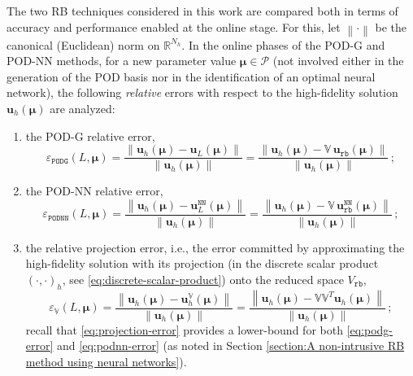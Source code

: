 \documentclass{elsarticle}
\numberwithin{equation}{section}
\theoremstyle{theorem}
\theoremstyle{definition}
\theoremstyle{remark}
\theoremstyle{proposition}
\numberwithin{figure}{section}
\newcommand{\norm}[1]{\left\lVert#1\right\rVert}
\newcommand{\bg}[1]{\boldsymbol{#1}}
\begin{document}
		The two RB techniques considered in this work are compared both in terms of accuracy and performance enabled at the online stage. For this, let $\norm{\cdot}$ be the canonical (Euclidean) norm on $\mathbb{R}^{N_h}$. In the online phases of the POD-G and POD-NN methods, for a new parameter value $\bg{\mu} \in \mathcal{P}$ (not involved either in the generation of the POD basis nor in the identification of an optimal neural network), the following \emph{relative} errors with respect to the high-fidelity solution $\mathbf{u}_h(\bg{\mu})$ are analyzed:
		\begin{enumerate}[label=(\alph*)]
			\item the POD-G relative error,
			\begin{equation}
				\label{eq:podg-error}
				\varepsilon_{\texttt{PODG}}^{}(L, \bg{\mu}) = \dfrac{\norm{\mathbf{u}_h(\bg{\mu}) - \mathbf{u}_L(\bg{\mu})}}{\norm{\mathbf{u}_h(\bg{\mu})}} = \dfrac{\norm{\mathbf{u}_h(\bg{\mu}) - \mathbb{V} \, \mathbf{u}_{\texttt{rb}}(\bg{\mu})}}{\norm{\mathbf{u}_h(\bg{\mu})}} \, ;
			\end{equation} 
			\item the POD-NN relative error,
			\begin{equation}
				\label{eq:podnn-error}
				\varepsilon_{\texttt{PODNN}}^{}(L, \bg{\mu}) = \dfrac{\norm{\mathbf{u}_h(\bg{\mu}) - \mathbf{u}_L^{\texttt{NN}}(\bg{\mu})}}{\norm{\mathbf{u}_h(\bg{\mu})}} = \dfrac{\norm{\mathbf{u}_h(\bg{\mu}) - \mathbb{V} \, \mathbf{u}_{\texttt{rb}}^{\texttt{NN}}(\bg{\mu})}}{\norm{\mathbf{u}_h(\bg{\mu})}} \, ;
			\end{equation} 
			\item the relative projection error, i.e., the error committed by approximating the high-fidelity solution with its projection (in the discrete scalar product $(\cdot,\cdot)_h$, see \eqref{eq:discrete-scalar-product}) onto the reduced space $V_{\texttt{rb}}$,
			\begin{equation}
				\label{eq:projection-error}
				\varepsilon_{\mathbb{V}}^{}(L, \bg{\mu}) = \dfrac{\norm{\mathbf{u}_h(\bg{\mu}) - \mathbf{u}_h^{\mathbb{V}}(\bg{\mu})}}{\norm{\mathbf{u}_h(\bg{\mu})}} = \dfrac{\norm{\mathbf{u}_h(\bg{\mu}) - \mathbb{V} \mathbb{V}^T \mathbf{u}_h(\bg{\mu})}}{\norm{\mathbf{u}_h(\bg{\mu})}} \, ;
			\end{equation}
			recall that \eqref{eq:projection-error} provides a lower-bound for both \eqref{eq:podg-error} and \eqref{eq:podnn-error} (as noted in Section \ref{section:A non-intrusive RB method using neural networks}). 
		\end{enumerate}
\end{document}
